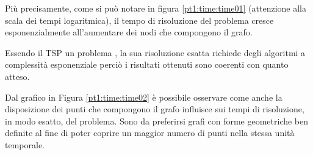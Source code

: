 Più precisamente, come si può notare in figura \ref{pt1:time:time01} (attenzione alla scala dei tempi logaritmica), il tempo di risoluzione del problema cresce esponenzialmente all'aumentare dei nodi che compongono il grafo.

Essendo il TSP un problema , la sua risoluzione esatta richiede degli algoritmi a complessità esponenziale perciò i risultati ottenuti sono coerenti con quanto atteso.

Dal grafico in Figura \ref{pt1:time:time02} è possibile osservare come anche la disposizione dei punti che compongono il grafo influisce sui tempi di risoluzione, in modo esatto, del problema. Sono da preferirsi grafi con forme geometriche ben definite al fine di poter coprire un maggior numero di punti nella stessa unità temporale.